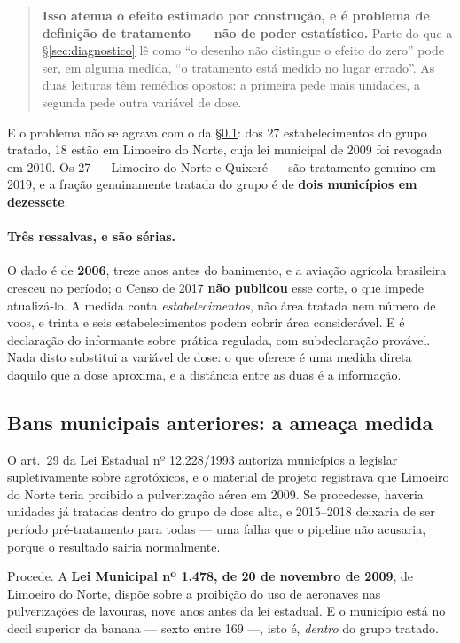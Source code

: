 \begin{quote}
\textbf{Isso atenua o efeito estimado por construção, e é problema de definição
de tratamento --- não de poder estatístico.} Parte do que a
§\ref{sec:diagnostico} lê como ``o desenho não distingue o efeito do zero'' pode
ser, em alguma medida, ``o tratamento está medido no lugar errado''. As duas
leituras têm remédios opostos: a primeira pede mais unidades, a segunda pede
outra variável de dose.
\end{quote}

E o problema não se agrava com o da §\ref{sub:bans}: dos 27 estabelecimentos
do grupo tratado, 18 estão em Limoeiro do Norte, cuja lei municipal de 2009 foi
revogada em 2010. Os 27 --- Limoeiro do Norte e Quixeré --- são tratamento
genuíno em 2019, e a fração genuinamente tratada do grupo é de \textbf{dois
municípios em dezessete}.

\paragraph{Três ressalvas, e são sérias.}
O dado é de \textbf{2006}, treze anos antes do banimento, e a aviação agrícola
brasileira cresceu no período; o Censo de 2017 \textbf{não publicou} esse corte,
o que impede atualizá-lo. A medida conta \emph{estabelecimentos}, não área
tratada nem número de voos, e trinta e seis estabelecimentos podem cobrir área
considerável. E é declaração do informante sobre prática regulada, com
subdeclaração provável. Nada disto substitui a variável de dose: o que oferece é
uma medida direta daquilo que a dose aproxima, e a distância entre as duas é a
informação.

\subsection{Bans municipais anteriores: a ameaça medida}
\label{sub:bans}

O art.~29 da Lei Estadual nº 12.228/1993 autoriza municípios a legislar
supletivamente sobre agrotóxicos, e o material de projeto registrava que
Limoeiro do Norte teria proibido a pulverização aérea em 2009. Se procedesse,
haveria unidades já tratadas dentro do grupo de dose alta, e 2015--2018 deixaria
de ser período pré-tratamento para todas --- uma falha que o pipeline não
acusaria, porque o resultado sairia normalmente.

Procede. A \textbf{Lei Municipal nº 1.478, de 20 de novembro de 2009}, de
Limoeiro do Norte, dispõe sobre a proibição do uso de aeronaves nas
pulverizações de lavouras, nove anos antes da lei estadual. E o município está
no decil superior da banana --- sexto entre 169 ---, isto é, \emph{dentro} do
grupo tratado.

